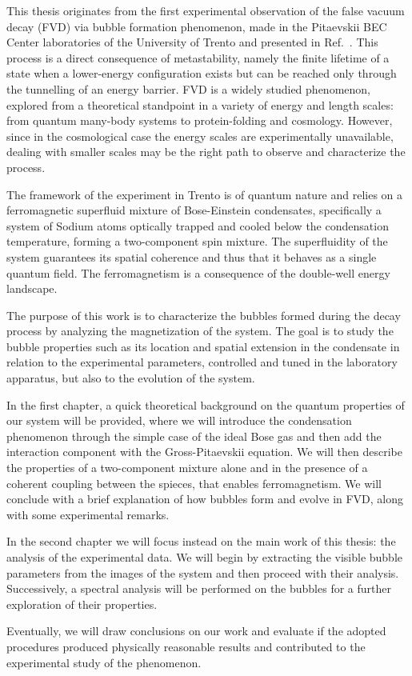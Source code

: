 This thesis originates from the first experimental observation of the false vacuum decay (FVD) via bubble formation phenomenon, made in the Pitaevskii BEC Center laboratories of the University of Trento and presented in Ref.\ \cite{zenesini2024false}. This process is a direct consequence of metastability, namely the finite lifetime of a state when a lower-energy configuration exists but can be reached only through the tunnelling of an energy barrier. FVD is a widely studied phenomenon, explored from a theoretical standpoint in a variety of energy and length scales: from quantum many-body systems to protein-folding and cosmology. However, since in the cosmological case the energy scales are experimentally unavailable, dealing with smaller scales may be the right path to observe and characterize the process.

The framework of the experiment in Trento is of quantum nature and relies on a ferromagnetic superfluid mixture of Bose-Einstein condensates, specifically a system of Sodium atoms optically trapped and cooled below the condensation temperature, forming a two-component spin mixture. The superfluidity of the system guarantees its spatial coherence and thus that it behaves as a single quantum field. The ferromagnetism is a consequence of the double-well energy landscape.

The purpose of this work is to characterize the bubbles formed during the decay process by analyzing the magnetization of the system. The goal is to study the bubble properties such as its location and spatial extension in the condensate in relation to the experimental parameters, controlled and tuned in the laboratory apparatus, but also to the evolution of the system. 

In the first chapter, a quick theoretical background on the quantum properties of our system will be provided, where we will introduce the condensation phenomenon through the simple case of the ideal Bose gas and then add the interaction component with the Gross-Pitaevskii equation. We will then describe the properties of a two-component mixture alone and in the presence of a coherent coupling between the spieces, that enables ferromagnetism. We will conclude with a brief explanation of how bubbles form and evolve in FVD, along with some experimental remarks.

In the second chapter we will focus instead on the main work of this thesis: the analysis of the experimental data. We will begin by extracting the visible bubble parameters from the images of the system and then proceed with their analysis. Successively, a spectral analysis will be performed on the bubbles for a further exploration of their properties.

Eventually, we will draw conclusions on our work and evaluate if the adopted procedures produced physically reasonable results and contributed to the experimental study of the phenomenon.